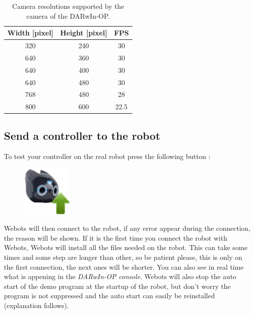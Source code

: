 \documentclass[a4paper, 12pt]{article}  		%
\begin{document}
\begin{table}[H]
\begin{center}
\begin{tabular}{ | c | c | c | }

\hline
Width [pixel] & Height [pixel] & FPS \\ 
\hline
\hline
320 & 240 & 30 \\
\hline
640 & 360 & 30 \\
\hline
640 & 400 & 30 \\
\hline
640 & 480 & 30 \\
\hline
768 & 480 & 28 \\
\hline
800 & 600 & 22.5 \\
\hline
\end{tabular}
\caption{Camera resolutions supported by the camera of the DARwIn-OP.}
\label{tab:cameraResolution}
\end{center}
\end{table}

\subsection{Send a controller to the robot}
To test your controller on the real robot press the following button :
\begin{figure}[H]
\begin{center}
\includegraphics[width=2.5cm]{send.png}
\label{send}
\end{center}
\end{figure}

Webots will then connect to the robot, if any error appear during the connection, the reason will be shown. If it is the first time you connect the robot with Webots, Webots will install all the files needed on the robot. This can take some times and some step are longer than other, so be patient please, this is only on the first connection, the next ones will be shorter. You can also see in real time what is appening in the \textit{DARwIn-OP console}. Webots will also stop the auto start of the demo program at the startup of the robot, but don't worry the program is not suppressed and the auto start can easily be reinstalled (explanation follows).\\
\end{document}
